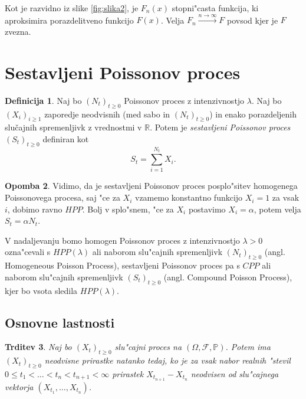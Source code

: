 \documentclass[12pt, a4paper, reqno]{amsart}
\theoremstyle{definition}
\newtheorem{definicija}{Definicija}[section]
\newtheorem{opomba}[definicija]{Opomba}
\theoremstyle{plain}
\newtheorem{trditev}[definicija]{Trditev}
\newcommand{\F}{\mathcal{F}}
\newcommand{\1}{\mathds{1}}
\begin{document}
    \noindent
    Kot je razvidno iz slike \ref{fig:slika2}, je $F_n(x)$ stopni"casta funkcija, ki aproksimira 
    porazdelitveno funkcijo $F(x)$. Velja $F_n \xrightarrow{n\to\infty}F$ povsod kjer je $F$ zvezna.


\section{Sestavljeni Poissonov proces}

    \begin{center}
    \end{center}
    \begin{definicija}
        Naj bo $(N_t)_{t\geq0}$ Poissonov proces z intenzivnostjo $\lambda$. 
        Naj bo $(X_i)_{i\geq1}$ zaporedje neodvisnih (med sabo in $(N_t)_{t\geq0}$) in enako 
        porazdeljenih slučajnih spremenljivk z vrednostmi v $\mathbb{R}$. Potem je 
        \textit{sestavljeni Poissonov proces} $(S_t)_{t\geq0}$ definiran kot
        $$
            S_t = \sum_{i=1}^{N_t} X_i.
        $$
        \label{def:CPP}
    \end{definicija}

    \begin{opomba}
        Vidimo, da je sestavljeni Poissonov proces posplo"sitev homogenega Poissonovega procesa, saj "ce za
        $X_i$ vzamemo konstantno funkcijo $X_i = 1$ za vsak $i$, dobimo ravno $HPP$. Bolj v splo"snem, "ce za $X_i$ 
        postavimo $X_i = \alpha$, potem velja $S_t = \alpha N_t$.
        \label{op:CPPHPPPovezava}
    \end{opomba}

    V nadaljevanju bomo homogen Poissonov proces z intenzivnostjo $\lambda >0$ ozna"cevali s $HPP(\lambda)$ 
    ali naborom slu"cajnih spremenljivk $(N_t)_{t\geq0}$ (angl. Homogeneous Poisson Process), 
    sestavljeni Poissonov proces pa s $CPP$ ali naborom slu"cajnih spremenljivk $(S_t)_{t\geq0}$ 
    (angl. Compound Poisson Process), kjer bo vsota sledila $HPP(\lambda)$.

    \subsection{Osnovne lastnosti}

        \begin{trditev}
            Naj bo $(X_t)_{t\geq0}$ slu"cajni proces na $(\Omega, \F, \mathbb{P})$. Potem ima $(X_t)_{t\geq0}$
            neodvisne prirastke natanko tedaj, ko je za vsak nabor realnih "stevil 
            $0 \leq t_1 < \ldots < t_n < t_{n+1} <\infty$ prirastek $X_{t_{n+1}} - X_{t_n}$ neodvisen od
            slu"cajnega vektorja $(X_{t_1}, \dots, X_{t_n})$.
            \label{trd:ekvivKarakterizacija}
        \end{trditev}
\end{document}
